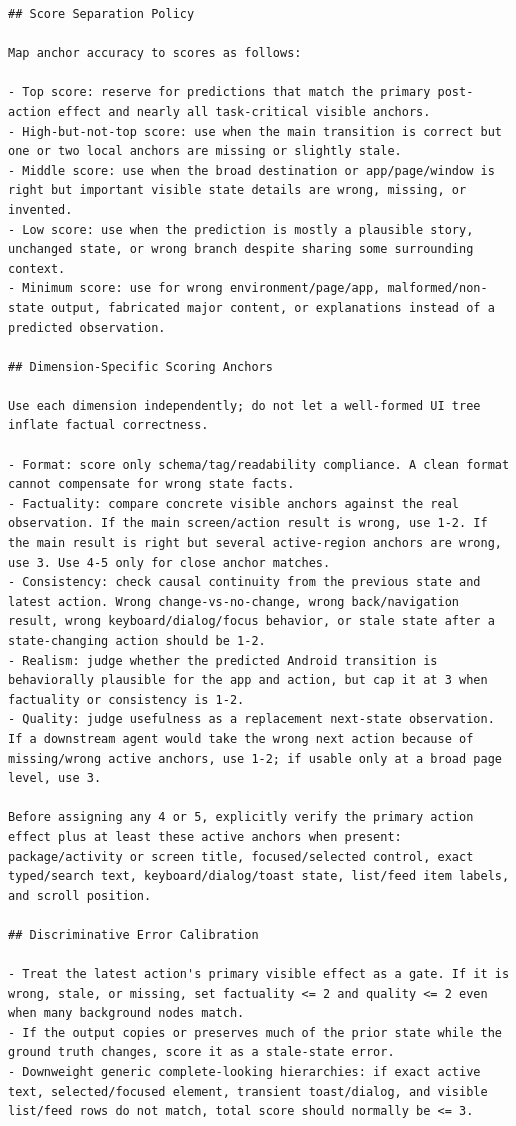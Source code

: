 \documentclass{llmxive}
\begin{document}
\begin{lstlisting}
## Score Separation Policy

Map anchor accuracy to scores as follows:

- Top score: reserve for predictions that match the primary post-action effect and nearly all task-critical visible anchors.
- High-but-not-top score: use when the main transition is correct but one or two local anchors are missing or slightly stale.
- Middle score: use when the broad destination or app/page/window is right but important visible state details are wrong, missing, or invented.
- Low score: use when the prediction is mostly a plausible story, unchanged state, or wrong branch despite sharing some surrounding context.
- Minimum score: use for wrong environment/page/app, malformed/non-state output, fabricated major content, or explanations instead of a predicted observation.

## Dimension-Specific Scoring Anchors

Use each dimension independently; do not let a well-formed UI tree inflate factual correctness.

- Format: score only schema/tag/readability compliance. A clean format cannot compensate for wrong state facts.
- Factuality: compare concrete visible anchors against the real observation. If the main screen/action result is wrong, use 1-2. If the main result is right but several active-region anchors are wrong, use 3. Use 4-5 only for close anchor matches.
- Consistency: check causal continuity from the previous state and latest action. Wrong change-vs-no-change, wrong back/navigation result, wrong keyboard/dialog/focus behavior, or stale state after a state-changing action should be 1-2.
- Realism: judge whether the predicted Android transition is behaviorally plausible for the app and action, but cap it at 3 when factuality or consistency is 1-2.
- Quality: judge usefulness as a replacement next-state observation. If a downstream agent would take the wrong next action because of missing/wrong active anchors, use 1-2; if usable only at a broad page level, use 3.

Before assigning any 4 or 5, explicitly verify the primary action effect plus at least these active anchors when present: package/activity or screen title, focused/selected control, exact typed/search text, keyboard/dialog/toast state, list/feed item labels, and scroll position.

## Discriminative Error Calibration

- Treat the latest action's primary visible effect as a gate. If it is wrong, stale, or missing, set factuality <= 2 and quality <= 2 even when many background nodes match.
- If the output copies or preserves much of the prior state while the ground truth changes, score it as a stale-state error.
- Downweight generic complete-looking hierarchies: if exact active text, selected/focused element, transient toast/dialog, and visible list/feed rows do not match, total score should normally be <= 3.
\end{lstlisting}
\end{document}
